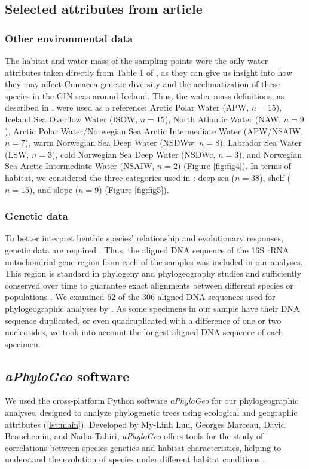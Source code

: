 \subsection{Selected attributes from article \cite{uhlir_adding_2021}} 
\subsubsection{Other environmental data} 
The habitat and water mass of the sampling points were the only water attributes taken directly from Table 1 of \citep{uhlir_adding_2021}, as they can give us insight into how they may affect Cumacea genetic diversity and the acclimatization of these species in the GIN seas around Iceland. Thus, the water mass definitions, as described in \citep{uhlir_adding_2021}, were used as a reference: Arctic Polar Water (APW, $n=15$), Iceland Sea Overflow Water (ISOW, $n=15$), North Atlantic Water (NAW, $n=9$), Arctic Polar Water/Norwegian Sea Arctic Intermediate Water (APW/NSAIW, $n=7$), warm Norwegian Sea Deep Water (NSDWw, $n=8$), Labrador Sea Water (LSW, $n=3$), cold Norwegian Sea Deep Water (NSDWc, $n=3$), and Norwegian Sea Arctic Intermediate Water (NSAIW, $n=2$) (Figure \ref{fig:fig4}). In terms of habitat, we considered the three categories used in \citep{uhlir_adding_2021}: deep sea ($n=38$), shelf ($n=15$), and slope ($n=9$) (Figure \ref{fig:fig5}).

\subsubsection{Genetic data} 
To better interpret benthic species' relationship and evolutionary responses, genetic data are required \citep{wilson_speciation_1987, uhlir_adding_2021}. Thus, the aligned DNA sequence of the 16S rRNA mitochondrial gene region from each of the samples was included in our analyses. This region is standard in phylogeny and phylogeography studies \citep{hugenholtz1998impact} and sufficiently conserved over time to guarantee exact alignments between different species or populations \citep{saccone1999evolutionary}. We examined 62 of the 306 aligned DNA sequences used for phylogeographic analyses by \citep{uhlir_adding_2021}. As some specimens in our sample have their DNA sequence duplicated, or even quadruplicated with a difference of one or two nucleotides, we took into account the longest-aligned DNA sequence of each specimen.

\subsection{{\textit{aPhyloGeo} software}\label{aPhyloGeo-software}}
We used the cross-platform Python software \textit{aPhyloGeo} for our phylogeographic analyses, designed to analyze phylogenetic trees using ecological and geographic attributes (\autoref{lst:main}). Developed by My-Linh Luu, Georges Marceau, David Beauchemin, and Nadia Tahiri, \textit{aPhyloGeo} offers tools for the study of correlations between species genetics and habitat characteristics, helping to understand the evolution of species under different habitat conditions \citep{koshkarov_phylogeography_2022}. 

